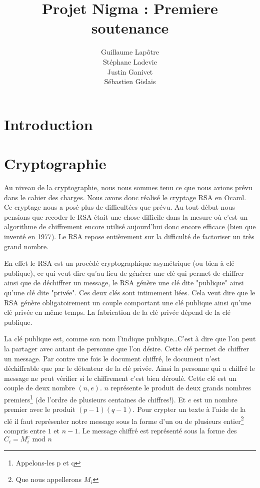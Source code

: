 \documentclass[a4paper,12pt]{article}
\title{Projet Nigma : Premiere soutenance}
\author{Guillaume Lapôtre\\Stéphane Ladevie\\Justin Ganivet\\Sébastien Gislais}
\begin{document}
	\maketitle{}
	\newpage
	\tableofcontents
	\newpage
	\section{Introduction}
	\section{Cryptographie}
		Au niveau de la cryptographie, nous nous sommes tenu  ce que nous avions prévu dans le cahier des charges. Nous avons donc réalisé le cryptage RSA en Ocaml. Ce cryptage nous a posé plus de difficultées que prévu. Au tout début nous pensions que recoder le RSA était une chose difficile dans la mesure où c'est un algorithme de chiffrement encore utilisé aujourd'hui donc encore efficace (bien que inventé en 1977). Le RSA repose entièrement sur la difficulté de factoriser un très grand nombre.
		
		En effet le RSA est un procédé cryptographique asymétrique (ou bien à clé publique), ce qui veut dire qu'au lieu de générer une clé qui permet de chiffrer ainsi que de déchiffrer un message, le RSA génère une clé dite "publique" ainsi qu'une clé dite "privée". Ces deux clés sont intimement liées. Cela veut dire que le RSA génère obligatoirement un couple comportant une clé publique ainsi qu'une clé privée en même temps. La fabrication de la clé privée dépend de la clé publique. 
		
		La clé publique est, comme son nom l'indique publique\dots C'est à dire que l'on peut la partager avec autant de personne que l'on désire. Cette clé permet de chiffrer un message. Par contre une fois le document chiffré, le document n'est déchiffrable que par le détenteur de la clé privée. Ainsi la personne qui a chiffré le message ne peut vérifier si le chiffrement c'est bien déroulé. Cette clé est un couple de deux nombre $(n,e)$. $n$ représente le produit de deux grands nombres premiers\footnote{Appelons-les p et q} (de l'ordre de plusieurs centaines de chiffres!). Et $e$ est un nombre premier avec le produit $(p - 1)(q - 1)$. Pour crypter un texte à l'aide de la clé il faut représenter notre message sous la forme d'un ou de plusieurs entier\footnote{Que nous appellerons $M_{i}$} compris entre $1$ et $n-1$. Le message chiffré est représenté sous la forme des $C_{i} = M_{i}^e \textrm{ mod } n$
		
\end{document}
